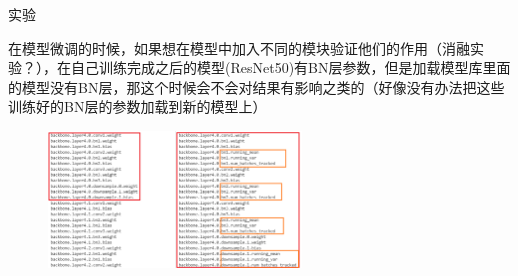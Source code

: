 \begin{frame}{实验}

    在模型微调的时候，如果想在模型中加入不同的模块验证他们的作用（消融实验？），在自己训练完成之后的模型(ResNet50)有BN层参数，但是加载模型库里面的模型没有BN层，那这个时候会不会对结果有影响之类的（好像没有办法把这些训练好的BN层的参数加载到新的模型上）
    \begin{figure}
        \centering
        \includegraphics[width=0.6\textwidth]{docs/0903/images/s.png}
    \end{figure}
\end{frame}